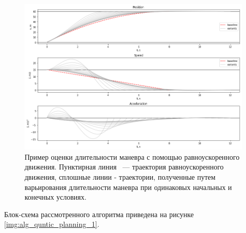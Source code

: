 \begin{figure}[h]
      \centering
      \includegraphics[width=\linewidth]{images/quintic_t_estimate}
      \caption{Пример оценки длительности маневра с помощью равноускоренного движения. Пунктирная линия ~---
      траектория равноускоренного движения, сплошные линии - траектории, полученные путем варьирования длительности
      маневра при одинаковых начальных и конечных условиях.}
      \label{img:quintic_t_estimate}
\end{figure}

Блок-схема рассмотренного алгоритма приведена на рисунке \ref{img:alg_quntic_planning_1}.

